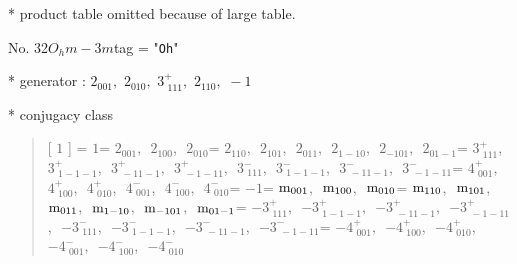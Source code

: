 \documentclass[fleqn,10pt,landscape]{jsarticle}
\begin{document}
* product table
\quad\quad omitted because of large table.

\newpage

No. 32\quad$O_{h}$\quad$m-3m$\quad[ cubic ]
tag = "{\tt Oh}"

* generator : $2{}_{001},\,\,2{}_{010},\,\,3^{+}_{\,\,111},\,\,2{}_{110},\,\,-1$

* conjugacy class
\begin{quote}
[ $1$ ] = \quad $1$\newline[ $2{}_{001}$ ] = \quad $2{}_{001}$,\,\, $2{}_{100}$,\,\, $2{}_{010}$\newline[ $2{}_{110}$ ] = \quad $2{}_{110}$,\,\, $2{}_{101}$,\,\, $2{}_{011}$,\,\, $2{}_{1-10}$,\,\, $2{}_{-101}$,\,\, $2{}_{01-1}$\newline[ $3^{+}_{\,\,111}$ ] = \quad $3^{+}_{\,\,111}$,\,\, $3^{+}_{\,\,1-1-1}$,\,\, $3^{+}_{\,\,-11-1}$,\,\, $3^{+}_{\,\,-1-11}$,\,\, $3^{-}_{\,\,111}$,\,\, $3^{-}_{\,\,1-1-1}$,\,\, $3^{-}_{\,\,-11-1}$,\,\, $3^{-}_{\,\,-1-11}$\newline[ $4^{+}_{\,\,001}$ ] = \quad $4^{+}_{\,\,001}$,\,\, $4^{+}_{\,\,100}$,\,\, $4^{+}_{\,\,010}$,\,\, $4^{-}_{\,\,001}$,\,\, $4^{-}_{\,\,100}$,\,\, $4^{-}_{\,\,010}$\newline[ $-1$ ] = \quad $-1$\newline[ ${\rm m}_{001}$ ] = \quad ${\rm m}_{001}$,\,\, ${\rm m}_{100}$,\,\, ${\rm m}_{010}$\newline[ ${\rm m}_{110}$ ] = \quad ${\rm m}_{110}$,\,\, ${\rm m}_{101}$,\,\, ${\rm m}_{011}$,\,\, ${\rm m}_{1-10}$,\,\, ${\rm m}_{-101}$,\,\, ${\rm m}_{01-1}$\newline[ $-3^{+}_{\,\,111}$ ] = \quad $-3^{+}_{\,\,111}$,\,\, $-3^{+}_{\,\,1-1-1}$,\,\, $-3^{+}_{\,\,-11-1}$,\,\, $-3^{+}_{\,\,-1-11}$,\,\, $-3^{-}_{\,\,111}$,\,\, $-3^{-}_{\,\,1-1-1}$,\,\, $-3^{-}_{\,\,-11-1}$,\,\, $-3^{-}_{\,\,-1-11}$\newline[ $-4^{+}_{\,\,001}$ ] = \quad $-4^{+}_{\,\,001}$,\,\, $-4^{+}_{\,\,100}$,\,\, $-4^{+}_{\,\,010}$,\,\, $-4^{-}_{\,\,001}$,\,\, $-4^{-}_{\,\,100}$,\,\, $-4^{-}_{\,\,010}$\newline
\end{quote}
\end{document}
